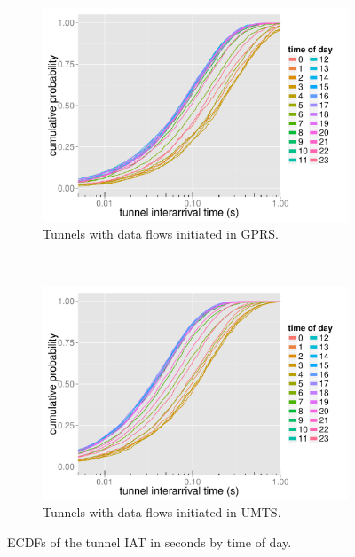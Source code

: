 \begin{figure}[htb]
        \begin{subfigure}[b]{0.5\textwidth}
                \centering
                \includegraphics[width=\textwidth]{images/R-IAT-fromflows-gprs-ecdfs-2h.pdf}
                \caption{Tunnels with data flows initiated in \gls{GPRS}.}
                \label{c4:fig:IAT-ecdf-2h-active-gprs}
        \end{subfigure}%
        ~
        \begin{subfigure}[b]{0.5\textwidth}
                \centering
                \includegraphics[width=\textwidth]{images/R-IAT-fromflows-umts-ecdfs-2h.pdf}
                \caption{Tunnels with data flows initiated in \gls{UMTS}.}
                \label{c4:fig:IAT-ecdf-2h-active-umts}
        \end{subfigure}
        \caption{\glspl{ECDF} of the tunnel \gls{IAT} in seconds by time of day.}
        \label{c4:fig:IAT-ecdf-2h}
\end{figure}


